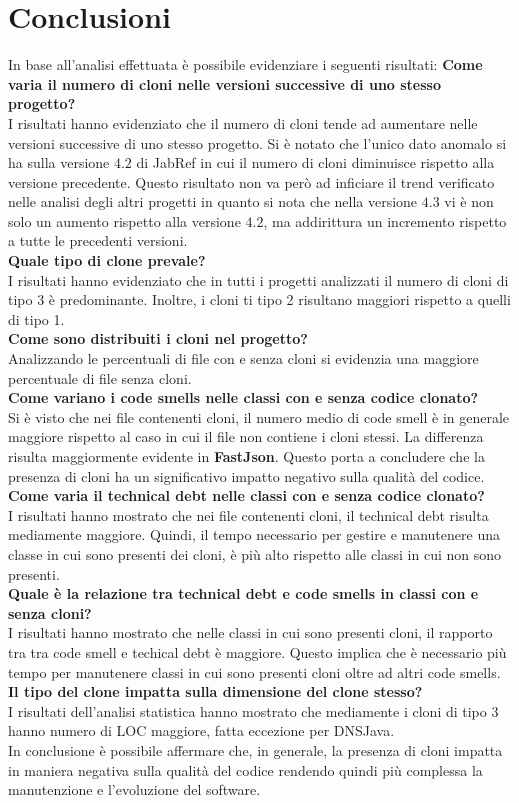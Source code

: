 \chapter{Conclusioni}\label{cap5}
In base all'analisi effettuata è possibile evidenziare i seguenti risultati:
\textbf{Come varia il numero di cloni nelle versioni successive di uno stesso progetto?}\\
I risultati hanno evidenziato che il numero di cloni tende ad aumentare nelle versioni successive di uno stesso progetto. Si è notato che l'unico dato anomalo si ha sulla versione $4.2$ di JabRef in cui il numero di cloni diminuisce rispetto alla versione precedente. Questo risultato non va però ad inficiare il trend verificato nelle analisi degli altri progetti in quanto si nota che nella versione $4.3$ vi è non solo un aumento rispetto alla versione $4.2$, ma addirittura un incremento rispetto a tutte le precedenti versioni. \\
\textbf{Quale tipo di clone prevale?}\\
I risultati hanno evidenziato che in tutti i progetti analizzati il numero di cloni di tipo 3 è predominante. Inoltre, i cloni ti tipo 2 risultano maggiori rispetto a quelli di tipo 1.\\
\textbf{Come sono distribuiti i cloni nel progetto?}\\
Analizzando le percentuali di file con e senza cloni si evidenzia una maggiore percentuale di file senza cloni. \\
\textbf{Come variano i code smells nelle classi con e senza codice clonato?}\\
Si è visto che nei file contenenti cloni, il numero medio di code smell è in generale maggiore rispetto al caso in cui il file non contiene i cloni stessi. La differenza risulta maggiormente evidente in \textbf{FastJson}. Questo porta a concludere che la presenza di cloni ha un significativo impatto negativo sulla qualità del codice. \\
\textbf{Come varia il technical debt nelle classi con e senza codice clonato?}\\
I risultati hanno mostrato che nei file contenenti cloni, il technical debt risulta mediamente maggiore. Quindi, il tempo necessario per gestire e manutenere una classe in cui sono presenti dei cloni, è più alto rispetto alle classi in cui non sono presenti. \\
\textbf{Quale è la relazione tra technical debt e code smells in classi con e senza cloni?}\\
I risultati hanno mostrato che nelle classi in cui sono presenti cloni, il rapporto tra tra code smell e techical debt è maggiore. Questo implica che è necessario più tempo per manutenere classi in cui sono presenti cloni oltre ad altri code smells.
\textbf{Il tipo del clone impatta sulla dimensione del clone stesso?}\\
I risultati dell'analisi statistica hanno mostrato che mediamente i cloni di tipo 3 hanno numero di LOC maggiore, fatta eccezione per DNSJava. \\

In conclusione è possibile affermare che, in generale, la presenza di cloni impatta in maniera negativa sulla qualità del codice rendendo quindi più complessa la manutenzione e l'evoluzione del software.